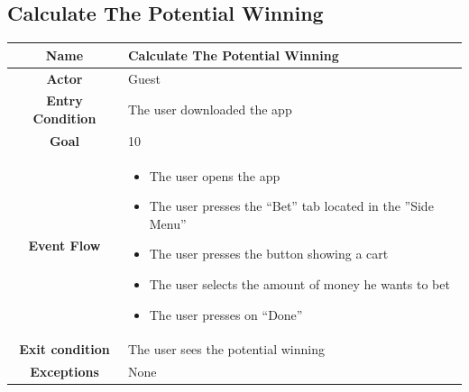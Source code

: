 \documentclass[numbers=noenddot, 12pt, a4paper, oneside]{scrbook}
\begin{document}
\subsection*{Calculate The Potential Winning}
\begin{tabular}{|c|p{}|}
	\hline
	\parbox[c][6ex]{6ex}{\centering \textbf{Name}} & Calculate The Potential Winning\\
	\hline
	\parbox[c][6ex]{6ex}{\centering \textbf{Actor}} & Guest \\
	\hline
	\parbox[c][10ex]{15ex}{\centering \textbf{Entry Condition}} & The user downloaded the app\\
	\hline
	\parbox[c][6ex]{15ex}{\centering \textbf{Goal}} &  10\\
	\hline
	\parbox[c][10ex]{12ex}{\centering \textbf{Event Flow}} & \begin{itemize}
		\item The user opens the app
		\item The user presses the “Bet” tab located in the ”Side Menu”
		\item The user presses the button showing a cart
		\item The user selects the amount of money he wants to bet 
		\item The user presses on “Done”
		
	\end{itemize}\\
	\hline
	\parbox[c][7ex]{12ex}{\centering \textbf{Exit condition}} & The user sees the potential winning \\\hline
	\parbox[c][10ex]{13ex}{\centering \textbf{Exceptions}} & None \\ \hline	
\end{tabular}
\newpage
\end{document}

